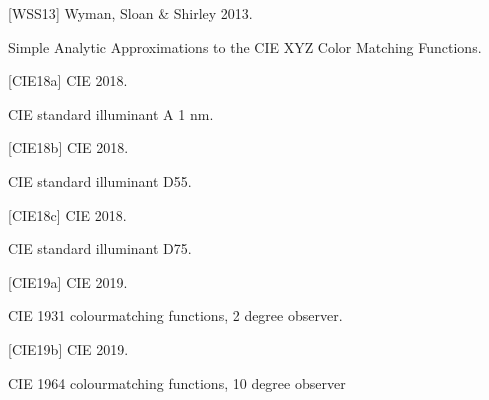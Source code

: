 \documentclass[letterpaper,10pt,english]{sphinxmanual}
\begin{document}
\begin{DUlineblock}{0em}
\item[] {[}WSS13{]} Wyman, Sloan \& Shirley 2013.
\item[] Simple Analytic Approximations to the CIE XYZ Color Matching Functions.
\item[] 
\end{DUlineblock}

\begin{DUlineblock}{0em}
\item[] {[}CIE18a{]} CIE 2018.
\item[] CIE standard illuminant A \sphinxhyphen{} 1 nm.
\item[] 
\end{DUlineblock}

\begin{DUlineblock}{0em}
\item[] {[}CIE18b{]} CIE 2018.
\item[] CIE standard illuminant D55.
\item[] 
\end{DUlineblock}

\begin{DUlineblock}{0em}
\item[] {[}CIE18c{]} CIE 2018.
\item[] CIE standard illuminant D75.
\item[] 
\end{DUlineblock}

\begin{DUlineblock}{0em}
\item[] {[}CIE19a{]} CIE 2019.
\item[] CIE 1931 colour\sphinxhyphen{}matching functions, 2 degree observer.
\item[] 
\end{DUlineblock}

\begin{DUlineblock}{0em}
\item[] {[}CIE19b{]} CIE 2019.
\item[] CIE 1964 colour\sphinxhyphen{}matching functions, 10 degree observer
\item[] 
\end{DUlineblock}
\end{document}
